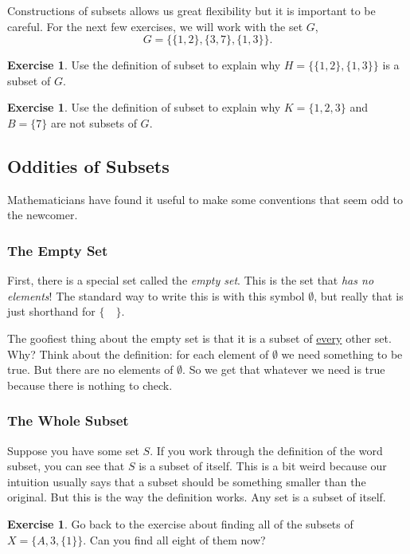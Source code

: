 \documentclass[12pt,letterpaper]{article}
\theoremstyle{definition}
\newtheorem{exercise}[question]{Exercise}
\begin{document}
Constructions of subsets allows us great flexibility but it is important to be careful. For the next few exercises, we will work with the set $G$,
\[
G = \{ \{1, 2\}, \{3, 7\}, \{1, 3\} \}.
\]

\begin{exercise}
Use the definition of subset to explain why $H = \{ \{1,2\}, \{1, 3\} \}$ is a subset of $G$.
\end{exercise}

\begin{exercise}
Use the definition of subset to explain why $K = \{ 1, 2, 3\}$ and $B = \{ 7\}$ are not subsets of $G$.
\end{exercise}

\subsection*{Oddities of Subsets}

Mathematicians have found it useful to make some conventions that seem odd to the newcomer.

\subsubsection*{The Empty Set}
First, there is a special set called the \emph{empty set}. 
This is the set that \emph{has no elements}! 
The standard way to write this is with this symbol $\emptyset$, but really that is just shorthand for $\{ \quad \}$. 

The goofiest thing about the empty set is that it is a subset of \underline{every} other set.
Why?
Think about the definition: for each element of $\emptyset$ we need something to be true.
But there are no elements of $\emptyset$.
So we get that whatever we need is true because there is nothing to check.

\subsubsection*{The Whole Subset}
Suppose you have some set $S$.
If you work through the definition of the word subset, you can see that $S$ is a subset of itself.
This is a bit weird because our intuition usually says that a subset should be something smaller than the original.
But this is the way the definition works. Any set is a subset of itself.

\begin{exercise}
Go back to the exercise about finding all of the subsets of $X = \{A, 3, \{1\} \}$.
Can you find all eight of them now?
\end{exercise}
\end{document}
